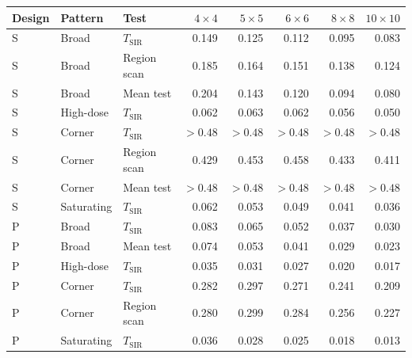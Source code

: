 \begin{tabular}{@{}lllrrrrr@{}}
\toprule
Design & Pattern & Test & $4\times4$ & $5\times5$ & $6\times6$ & $8\times8$ & $10\times10$\\
\midrule
S & Broad & $T_{\mathrm{SIR}}$ & 0.149 & 0.125 & 0.112 & 0.095 & 0.083\\
S & Broad & Region scan & 0.185 & 0.164 & 0.151 & 0.138 & 0.124\\
S & Broad & Mean test & 0.204 & 0.143 & 0.120 & 0.094 & 0.080\\
S & High-dose & $T_{\mathrm{SIR}}$ & 0.062 & 0.063 & 0.062 & 0.056 & 0.050\\
S & Corner & $T_{\mathrm{SIR}}$ & $>0.48$ & $>0.48$ & $>0.48$ & $>0.48$ & $>0.48$\\
S & Corner & Region scan & 0.429 & 0.453 & 0.458 & 0.433 & 0.411\\
S & Corner & Mean test & $>0.48$ & $>0.48$ & $>0.48$ & $>0.48$ & $>0.48$\\
S & Saturating & $T_{\mathrm{SIR}}$ & 0.062 & 0.053 & 0.049 & 0.041 & 0.036\\
\addlinespace
P & Broad & $T_{\mathrm{SIR}}$ & 0.083 & 0.065 & 0.052 & 0.037 & 0.030\\
P & Broad & Mean test & 0.074 & 0.053 & 0.041 & 0.029 & 0.023\\
P & High-dose & $T_{\mathrm{SIR}}$ & 0.035 & 0.031 & 0.027 & 0.020 & 0.017\\
P & Corner & $T_{\mathrm{SIR}}$ & 0.282 & 0.297 & 0.271 & 0.241 & 0.209\\
P & Corner & Region scan & 0.280 & 0.299 & 0.284 & 0.256 & 0.227\\
P & Saturating & $T_{\mathrm{SIR}}$ & 0.036 & 0.028 & 0.025 & 0.018 & 0.013\\
\bottomrule
\end{tabular}
